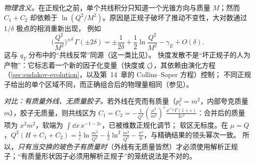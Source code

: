\begin{example}
\emph{物理含义。}在正规化之前，单个共线积分只知道一个光锥方向与质量 $M$；然而 $C_1+C_2$ 却依赖于 $\ln(Q^2/M^2)$。原因是正规子破坏了推动不变性，大对数通过 $1/\delta$ 极点的相消重新出现，
例如
\[
\Big(\frac{Q^2}{M^2}\Big)^{\pm\delta}\,\Gamma(\pm2\delta)=\pm\frac1{2\delta}+\frac12\ln\frac{Q^2}{M^2}-\gamma_E+O(\delta).
\]
这与 $q_T$ 分布中的“共线反常”同源\cite{BecherNeubert2011}（这一类比见\cite[第~2.3~节]{BecherBroggioFerroglia2015}）。
快度发散不是“坏正规子的人为产物”：它标志着一个新的因子化变量（快度或 $\zeta$），其依赖由演化方程（\cref{sec:sudakov-evolution}，以及第~14~章的 Collins--Soper 方程）控制；
不同正规子给出的单个区域不同，而正确组合后的物理量相同（参见\cite{BecherBell2012}）。

\emph{对比：有质量外线、无质量胶子。}若外线在壳而有质量（$p_i^2=m^2$，内部夸克质量 $m$），胶子无质量，则共线区为
$C_1=C_2=-\frac1{Q^2}(\frac{\mu^2}{m^2})^\varepsilon\frac{\ee^{\varepsilon\gamma_E}\Gamma(1+\varepsilon)}{2\varepsilon^2}$：合并后的质量项为 $x^2m^2$，软端为 $\int\dd x\,x^{-1-2\varepsilon}$，已被维数正规化调节；
软区无标度。在 $\mu=Q$，$Q^2(H+C_1+C_2)=\frac1\varepsilon\ln\frac{m^2}{Q^2}-\frac12\ln^2\frac{m^2}{Q^2}-\frac{\pi^2}6$，与精确结果的领头幂次一致。%
所以，\emph{只有当交换的玻色子有质量时}（外线有无质量皆然）才必须使用解析正规子；“有质量形状因子必须用解析正规子”的笼统说法是不对的。
\end{example}

